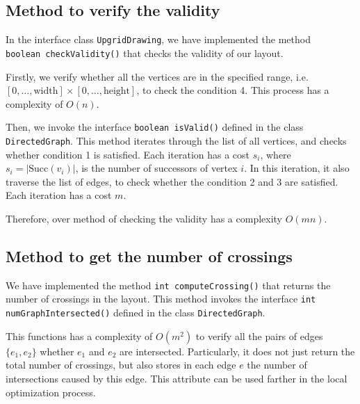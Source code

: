 \subsection{Method to verify the validity}

In the interface class \lstinline{UpgridDrawing}, we have implemented the method\\
\lstinline{boolean checkValidity()} that checks the validity of our layout.

Firstly, we verify whether all the vertices are in the specified range, i.e. $[0, \dots, \text{width}] \times [0, \dots, \text{height}]$, to check the condition 4. This process has a complexity of $O(n)$.

Then, we invoke the interface \lstinline{boolean isValid()} defined in the class \lstinline{DirectedGraph}. This method iterates through the list of all vertices, and checks whether condition 1 is satisfied. Each iteration has a cost $s_i$, where $s_i = |\text{Succ}(v_i)|$, is the number of successors of vertex $i$. In this iteration, it also traverse the list of edges, to check whether the condition 2 and 3 are satisfied. Each iteration has a cost $m$.

Therefore, over method of checking the validity has a complexity $O(mn)$.



\subsection{Method to get the number of crossings}
We have implemented the method \lstinline{int computeCrossing()} that returns the number of crossings in the layout. 
This method invokes the interface \lstinline{int numGraphIntersected()} defined in the class \lstinline{DirectedGraph}. 

This functions has a complexity of $O(m^2)$ to verify all the pairs of edges $\{e_1, e_2\}$ whether $e_1$ and $e_2$ are intersected. 
Particularly, it does not just return the total number of crossings, but also stores in each edge $e$ the number of intersections caused by this edge. This attribute can be used farther in the local optimization process.




